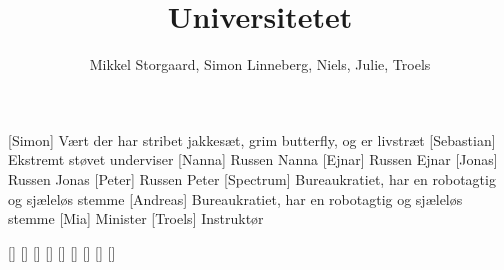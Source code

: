 \documentclass[a4paper,11pt]{article}
\title{Universitetet}
\author{Mikkel Storgaard, Simon Linneberg, Niels, Julie, Troels}
\begin{document}
\maketitle

\begin{roles}
  [Simon] Vært der har stribet jakkesæt, grim butterfly, og er livstræt
  [Sebastian] Ekstremt støvet underviser
  [Nanna] Russen Nanna
  [Ejnar] Russen Ejnar
  [Jonas] Russen Jonas
  [Peter] Russen Peter
  [Spectrum] Bureaukratiet, har en robotagtig og sjæleløs stemme
  [Andreas] Bureaukratiet, har en robotagtig og sjæleløs stemme
  [Mia] Minister
  [Troels] Instruktør
\end{roles}

\begin{props}
[]
[]
[]
[]
[]
[]
[]
[]
[]
\end{props}
\end{document}
